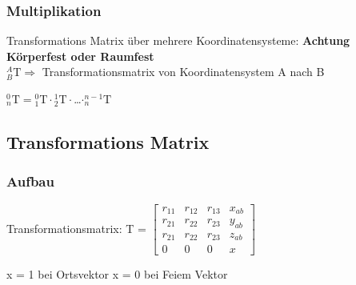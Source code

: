 \begin{minipage}{0.5\linewidth}
 \subsubsection{Multiplikation }
 \vspace{\baselineskip}
Transformations Matrix über mehrere Koordinatensysteme: \textbf{Achtung Körperfest oder Raumfest}\\

${}^A_B\mathrm{T} \Rightarrow$
Transformationsmatrix von \newline
\qquad Koordinatensystem A nach B\newline

${}^0_n\mathrm{T}={}^0_1\mathrm{T}\cdot{}^1_2\mathrm{T}\cdot{}$\ldots$\cdot{}^{n-1}_n\mathrm{T}$
\end{minipage}
\begin{minipage}{0.5\linewidth}
     \subsection{Transformations Matrix}
    \subsubsection{Aufbau}
    Transformationsmatrix: T = $ 
    \begin{bmatrix} 
    r_{11} & r_{12} & r_{13} & x_{ab} \\
    r_{21} & r_{22} & r_{23} & y_{ab} \\
    r_{21} & r_{22} & r_{23} & z_{ab} \\
    0 & 0 & 0 & x                              
    \end{bmatrix}$
    
    x = 1 bei Ortsvektor \hspace{1cm} x = 0 bei Feiem Vektor
    
\end{minipage}

